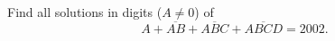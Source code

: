 Find all solutions in digits ($A\ne0$) of
\[
A+\overline{AB}+\overline{ABC}+\overline{ABCD}=2002 .
\]

